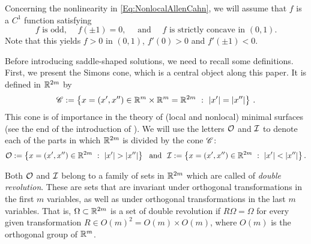 Concerning the nonlinearity in \eqref{Eq:NonlocalAllenCahn}, we will assume that $f$ is a $C^1$ function satisfying
\begin{equation}
\label{Eq:Hypothesesf}
f \textrm{ is odd, } \quad f(\pm 1)=0, \quad \text{ and } \quad f \textrm{ is strictly concave in }  (0,1).
\end{equation}
Note that this yields $f>0$ in $(0,1)$, $f'(0)>0$ and $f'(\pm 1) < 0$. 


Before introducing saddle-shaped solutions, we need to recall some definitions. First, we present the Simons cone, which is a central object along this paper. It is defined in $\mathbb{R}^{2m}$ by
$$
\mathscr{C} := \left \{ x = (x', x'') \in \mathbb{R}^m \times \mathbb{R}^m = \mathbb{R}^{2m} \ : \ |x'| = |x''| \right \}\,.
$$
This cone is of importance in the theory of (local and nonlocal) minimal surfaces (see the end of the introduction of \cite{FelipeSanz-Perela:IntegroDifferentialI}). 
We will use the letters $\mathcal{O}$ and $\mathcal{I}$ to denote each of the parts in which $\mathbb{R}^{2m}$ is divided by the cone $\mathscr{C}$:
$$
\mathcal{O}:= \left \{ x = (x', x'') \in \mathbb{R}^{2m} \ : \ |x'| > |x''| \right \} \ \textrm{ and } \
\mathcal{I}:= \left \{ x = (x', x'') \in \mathbb{R}^{2m} \ : \ |x'| < |x''| \right \}.
$$

Both $\mathcal{O}$ and $\mathcal{I}$ belong to a family of sets in $\mathbb{R}^{2m}$ which are called of \emph{double revolution}. These are sets that are invariant under orthogonal transformations in the first $m$ variables, as well as under orthogonal transformations in the last $m$ variables. That is, $\Omega\subset \mathbb{R}^{2m}$ is a set of double revolution if $R\Omega = \Omega$ for every given transformation $R\in O(m)^2 = O(m) \times O(m)$, where  $O(m)$ is the orthogonal group of $\mathbb{R}^m$.


